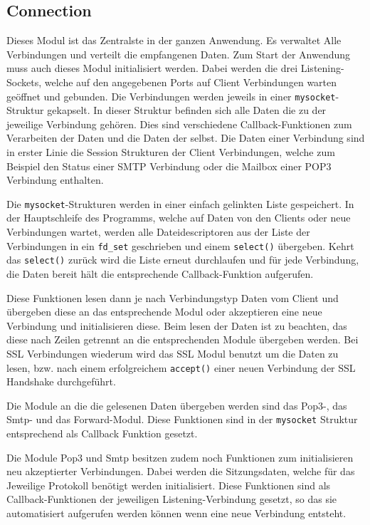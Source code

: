 \documentclass[final,a4paper,11pt,notitlepage,halfparskip]{scrreprt}
\begin{document}
\subsection{Connection}
Dieses Modul ist das Zentralste in der ganzen Anwendung. Es verwaltet Alle
Verbindungen und verteilt die empfangenen Daten. Zum Start der Anwendung muss
auch dieses Modul initialisiert werden. Dabei werden die drei Listening-Sockets,
welche auf den angegebenen Ports auf Client Verbindungen warten geöffnet und
gebunden. Die Verbindungen werden jeweils in einer \texttt{mysocket}-Struktur
gekapselt. In dieser Struktur befinden sich alle Daten die zu der jeweilige
Verbindung gehören. Dies sind verschiedene Callback-Funktionen zum Verarbeiten
der Daten und die Daten der selbst. Die Daten einer Verbindung sind in erster
Linie die Session Strukturen der Client Verbindungen, welche zum Beispiel den
Status einer SMTP Verbindung oder die Mailbox einer POP3 Verbindung enthalten.

Die \texttt{mysocket}-Strukturen werden in einer einfach gelinkten Liste
gespeichert. In der Hauptschleife des Programms, welche auf Daten von den
Clients oder neue Verbindungen wartet, werden alle Dateidescriptoren aus der
Liste der Verbindungen in ein \texttt{fd\_set} geschrieben und einem
\texttt{select()} übergeben. Kehrt das \texttt{select()} zurück wird die Liste
erneut durchlaufen und für jede Verbindung, die Daten bereit hält die
entsprechende Callback-Funktion aufgerufen.

Diese Funktionen lesen dann je nach Verbindungstyp Daten vom Client und
übergeben diese an das entsprechende Modul oder akzeptieren eine neue Verbindung
und initialisieren diese.
Beim lesen der Daten ist zu beachten, das diese nach Zeilen getrennt an die
entsprechenden Module übergeben werden. Bei SSL Verbindungen wiederum wird das
SSL Modul benutzt um die Daten zu lesen, bzw. nach einem erfolgreichem 
\texttt{accept()} einer neuen Verbindung der SSL Handshake durchgeführt.

Die Module an die die gelesenen Daten übergeben werden sind das Pop3-, das 
Smtp- und das Forward-Modul. Diese Funktionen sind in der \texttt{mysocket}
Struktur entsprechend als Callback Funktion gesetzt.

Die Module Pop3 und Smtp besitzen zudem noch Funktionen zum initialisieren neu
akzeptierter Verbindungen. Dabei werden die Sitzungsdaten, welche für das 
Jeweilige Protokoll benötigt werden initialisiert. Diese Funktionen sind als 
Callback-Funktionen der jeweiligen Listening-Verbindung gesetzt, so das sie 
automatisiert aufgerufen werden können wenn eine neue Verbindung entsteht.
\end{document}
